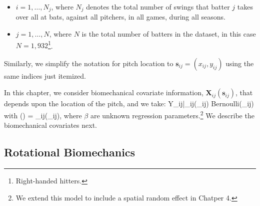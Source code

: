 \begin{itemize}

\item $i  = 1,\ldots,N_j$, where $N_j$ denotes the total number of swings that batter $j$ takes over all at bats, against all pitchers, in all games, during all seasons.

\item $j = 1,\ldots,N$, where $N$ is the total number of batters in the dataset, in this case $N = 1,932$\footnote{Right-handed hitters.}.

\end{itemize}

Similarly, we simplify the notation for pitch location to $\mathbf{s}_{ij} = (x_{ij},y_{ij})$ using the same indices just itemized.

In this chapter, we consider biomechanical covariate information, $\mathbf{X}_{ij}(\mathbf{s}_{ij})$, that depends upon the location of the pitch, and we take:
\bdm
Y_{ij}|_{ij}(_{ij})  \mbox{Bernoulli}(\pi_{ij})
\edm
with
\bdm
\log\left(\right) = _{ij}(_{ij})\beta,
\edm
where $\beta$ are unknown regression parameters.\footnote{We extend this model to include a spatial random effect in Chatper 4.}  We describe the biomechanical covariates next.

\subsection{Rotational Biomechanics} %

